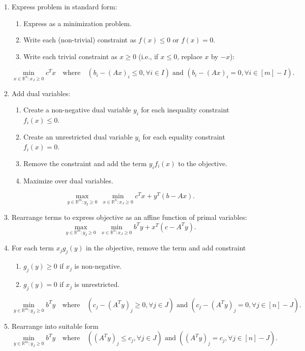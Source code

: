 \documentclass[a4paper,12pt,fleqn]{article}
\newenvironment*{tightenum}{\begin{enumerate}[noitemsep]}{\end{enumerate}}
\begin{document}
\begin{enumerate}
\item Express problem in standard form:
    \begin{tightenum}
    \item Express as a minimization problem.
    \item Write each (non-trivial) constraint as $f(x) \le 0$ or $f(x) = 0$.
    \item Write each trivial constraint as $x \ge 0$ (i.e., if $x \le 0$, replace $x$ by $-x$):
    \end{tightenum}
\[ \min_{x \in \mathbb{R}^n: x_J \ge 0} c^Tx \quad\textrm{where}\quad
(b_i - (Ax)_i \le 0, \forall i \in I) \textrm{ and } (b_i - (Ax)_i = 0, \forall i \in [m]-I). \]
\item Add dual variables:
    \begin{tightenum}
    \item Create a non-negative dual variable $y_i$ for each inequality constraint $f_i(x) \le 0$.
    \item Create an unrestricted dual variable $y_i$ for each equality constraint $f_i(x) = 0$.
    \item Remove the constraint and add the term $y_if_i(x)$ to the objective.
    \item Maximize over dual variables.
    \end{tightenum}
\[ \max_{y \in \mathbb{R}^m: y_I \ge 0}\; \min_{x \in \mathbb{R}^n: x_J \ge 0} c^Tx + y^T(b - Ax). \]
\item Rearrange terms to express objective as an affine function of primal variables:
\[ \max_{y \in \mathbb{R}^m: y_I \ge 0}\; \min_{x \in \mathbb{R}^n: x_J \ge 0} b^Ty + x^T(c - A^Ty). \]
\item For each term $x_jg_j(y)$ in the objective, remove the term and add constraint
    \begin{tightenum}
    \item $g_j(y) \ge 0$ if $x_j$ is non-negative.
    \item $g_j(y) = 0$ if $x_j$ is unrestricted.
    \end{tightenum}
\[ \min_{y \in \mathbb{R}^m: y_J \ge 0} b^Ty \quad\textrm{where}\quad
(c_j - (A^Ty)_j \ge 0, \forall j \in J) \textrm{ and } (c_j - (A^Ty)_j = 0, \forall j \in [n]-J). \]
\item Rearrange into suitable form
\[ \min_{y \in \mathbb{R}^m: y_J \ge 0} b^Ty \quad\textrm{where}\quad
((A^Ty)_j \le c_j, \forall j \in J) \textrm{ and } ((A^Ty)_j = c_j, \forall j \in [n]-J). \]
\end{enumerate}
\end{document}
